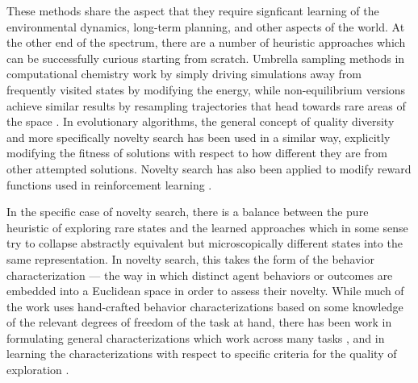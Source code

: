 \documentclass[letterpaper]{article}
\begin{document}
These methods share the aspect that they require signficant learning of the environmental dynamics, long-term planning, and other aspects of the world. At the other end of the spectrum, there are a number of heuristic approaches which can be successfully curious starting from scratch. Umbrella sampling methods \citep{torrie1977nonphysical} in computational chemistry work by simply driving simulations away from frequently visited states by modifying the energy, while non-equilibrium versions achieve similar results by resampling trajectories that head towards rare areas of the space \citep{dickson2010enhanced}. In evolutionary algorithms, the general concept of quality diversity \citep{pugh2016quality} and more specifically novelty search \citep{stanley2011} has been used in a similar way, explicitly modifying the fitness of solutions with respect to how different they are from other attempted solutions. Novelty search has also been applied to modify reward functions used in reinforcement learning \citep{conti2017improving}.

In the specific case of novelty search, there is a balance between the pure heuristic of exploring rare states and the learned approaches which in some sense try to collapse abstractly equivalent but microscopically different states into the same representation. In novelty search, this takes the form of the behavior characterization --- the way in which distinct agent behaviors or outcomes are embedded into a Euclidean space in order to assess their novelty. While much of the work uses hand-crafted behavior characterizations based on some knowledge of the relevant degrees of freedom of the task at hand, there has been work in formulating general characterizations which work across many tasks \citep{doncieux2013behavioral}, and in learning the characterizations with respect to specific criteria for the quality of exploration \citep{meyerson2016learning}.
\end{document}
